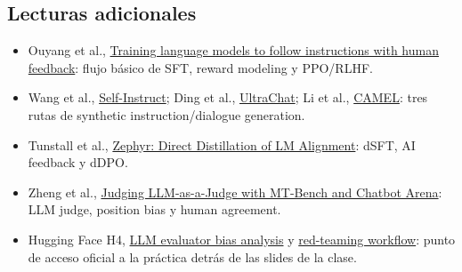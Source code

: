 \documentclass[a4paper]{article}
\begin{document}
\subsection{Lecturas adicionales}

\begingroup
\scriptsize
\begin{itemize}[itemsep=0pt,topsep=0.15em,parsep=0pt]
  \item Ouyang et al., \href{https://arxiv.org/abs/2203.02155}{Training language models to follow instructions with human feedback}: flujo básico de SFT, reward modeling y PPO/RLHF.
  \item Wang et al., \href{https://arxiv.org/abs/2212.10560}{Self-Instruct}; Ding et al., \href{https://arxiv.org/abs/2305.14233}{UltraChat}; Li et al., \href{https://arxiv.org/abs/2303.17760}{CAMEL}: tres rutas de synthetic instruction/dialogue generation.
  \item Tunstall et al., \href{https://arxiv.org/abs/2310.16944}{Zephyr: Direct Distillation of LM Alignment}: dSFT, AI feedback y dDPO.
  \item Zheng et al., \href{https://arxiv.org/abs/2306.05685}{Judging LLM-as-a-Judge with MT-Bench and Chatbot Arena}: LLM judge, position bias y human agreement.
  \item Hugging Face H4, \href{https://huggingface.co/blog/llm-leaderboard}{LLM evaluator bias analysis} y \href{https://huggingface.co/blog/red-teaming}{red-teaming workflow}: punto de acceso oficial a la práctica detrás de las slides de la clase.
\end{itemize}
\endgroup
\end{document}

